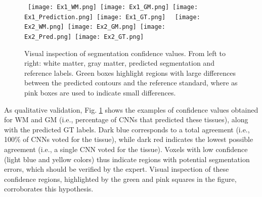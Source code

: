 \documentclass[twoside,espcrc2]{elsarticle}
\begin{document}
\begin{figure}[ht!]
\begin{center}
     \mbox{
        \texttt{[image: Ex1\_WM.png]}
        \hspace{-2.5 mm}
        \texttt{[image: Ex1\_GM.png]}
        \hspace{-2.5 mm}
        \texttt{[image: Ex1\_Prediction.png]} \hspace{-2.5 mm}
        \texttt{[image: Ex1\_GT.png]}
        }
    \mbox{
        \texttt{[image: Ex2\_WM.png]}
        \hspace{-2.5 mm}
        \texttt{[image: Ex2\_GM.png]}
        \hspace{-2.5 mm}
        \texttt{[image: Ex2\_Pred.png]}
        \hspace{-2.5 mm}
        \texttt{[image: Ex2\_GT.png]}
        }    
\caption{Visual inspection of segmentation confidence values. From left to right: white matter, gray matter, predicted segmentation and reference labels. Green boxes highlight regions with large differences between the predicted contours and the reference standard, where as pink boxes are used to indicate small differences. }
\label{fig:confidence}
\end{center}
\end{figure}

As qualitative validation, Fig. \ref{fig:confidence} shows the examples of confidence values obtained for WM and GM (i.e., percentage of CNNs that predicted these tissues), along with the predicted GT labels. Dark blue corresponds to a total agreement (i.e., 100$\%$ of CNNs voted for the tissue), while dark red indicates the lowest possible agreement (i.e., a single CNN voted for the tissue). Voxels with low confidence (light blue and yellow colors) thus indicate regions with potential segmentation errors, which should be verified by the expert. Visual inspection of these confidence regions, highlighted by the green and pink squares in the figure, corroborates this hypothesis.
\end{document}
